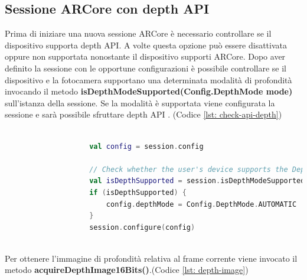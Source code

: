 \documentclass[crop=false, class=book]{standalone}
\begin{document}
		\clearpage
		
		\subsection{Sessione ARCore con depth API}
		
			Prima di iniziare una nuova sessione ARCore è necessario controllare se il dispositivo supporta depth API. A volte 				questa opzione può essere disattivata oppure non supportata nonostante il dispositivo supporti ARCore. Dopo aver 				definito la sessione con le opportune configurazioni è possibile controllare se il dispositivo e la fotocamera 					supportano una determinata modalità di profondità invocando il metodo \textbf{isDepthModeSupported(Config.DepthMode 			mode)} sull'istanza della sessione. Se la modalità è supportata viene configurata la sessione e sarà possibile 					sfruttare depth API \cite{google2022depth}. (Codice \vref{lst: check-api-depth})\\
		
			\begin{center}
				\begin{minipage}{0.95\textwidth}
					\begin{lstlisting}[caption={ Controllo supporto depth API}, label={lst: check-api-depth}, language=Kotlin]
				
					val config = session.config

					// Check whether the user's device supports the Depth API.
					val isDepthSupported = session.isDepthModeSupported(Config.DepthMode.AUTOMATIC)
					if (isDepthSupported) {
  						config.depthMode = Config.DepthMode.AUTOMATIC
					}
					session.configure(config)
				
					\end{lstlisting}
			\end{minipage}
		\end{center}
		
		\begin{flushleft}
		Per ottenere l'immagine di profondità relativa al frame corrente viene invocato il metodo 										\textbf{acquireDepthImage16Bits()}.(Codice \vref{lst: depth-image})\\
		\end{flushleft}
		
\end{document}
